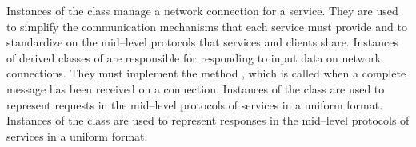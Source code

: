 Instances of the  class manage a
\yarp{} network connection for a service.
They are used to simplify the communication mechanisms that each service must provide and
to standardize on the mid--level protocols that \mplusm{} services and clients share.
\secondaryEnd{}
Instances of derived classes of
 are responsible for
responding to input data on \yarp{} network connections.
They must implement the method , which is called when a complete
message has been received on a connection.
Instances of the  class
are used to represent requests in the mid--level protocols of \mplusm{} services in a
uniform format.
\secondaryEnd{}
Instances of the 
class are used to represent responses in the mid--level protocols of \mplusm{} services in
a uniform format.
\secondaryEnd{}
\primaryEnd{}
